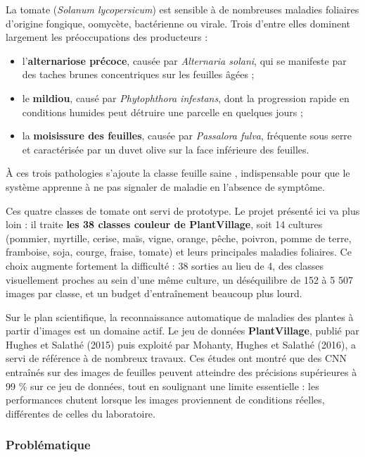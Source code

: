 \documentclass[10pt,a4paper]{article}
\begin{document}
La tomate (\emph{Solanum lycopersicum}) est sensible à de nombreuses maladies foliaires d'origine fongique, oomycète, bactérienne ou virale. Trois d'entre elles dominent largement les préoccupations des producteurs :

\begin{itemize}
\item l'\textbf{alternariose précoce}, causée par \emph{Alternaria solani}, qui se manifeste par des taches brunes concentriques sur les feuilles âgées ;
\item le \textbf{mildiou}, causé par \emph{Phytophthora infestans}, dont la progression rapide en conditions humides peut détruire une parcelle en quelques jours ;
\item la \textbf{moisissure des feuilles}, causée par \emph{Passalora fulva}, fréquente sous serre et caractérisée par un duvet olive sur la face inférieure des feuilles.
\end{itemize}

À ces trois pathologies s'ajoute la classe \guillemotleft{} feuille saine \guillemotright{}, indispensable pour que le système apprenne à ne pas signaler de maladie en l'absence de symptôme.

Ces quatre classes de tomate ont servi de prototype. Le projet présenté ici va plus loin : il traite \textbf{les 38 classes couleur de PlantVillage}, soit 14 cultures (pommier, myrtille, cerise, maïs, vigne, orange, pêche, poivron, pomme de terre, framboise, soja, courge, fraise, tomate) et leurs principales maladies foliaires. Ce choix augmente fortement la difficulté : 38 sorties au lieu de 4, des classes visuellement proches au sein d'une même culture, un déséquilibre de 152 à 5 507 images par classe, et un budget d'entraînement beaucoup plus lourd.

Sur le plan scientifique, la reconnaissance automatique de maladies des plantes à partir d'images est un domaine actif. Le jeu de données \textbf{PlantVillage}, publié par Hughes et Salathé (2015) puis exploité par Mohanty, Hughes et Salathé (2016), a servi de référence à de nombreux travaux. Ces études ont montré que des CNN entraînés sur des images de feuilles peuvent atteindre des précisions supérieures à 99 \% sur ce jeu de données, tout en soulignant une limite essentielle : les performances chutent lorsque les images proviennent de conditions réelles, différentes de celles du laboratoire.

\subsubsection{Problématique}
\end{document}

